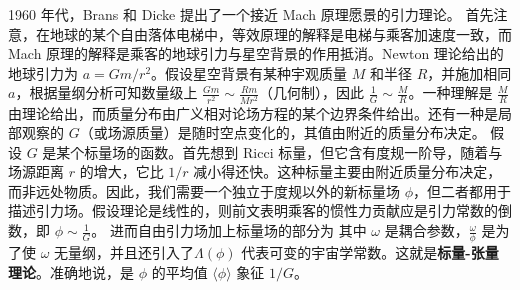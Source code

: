1960 年代，Brans 和 Dicke\cite{Brans-Dicke} 提出了一个接近 Mach 原理愿景的引力理论。
首先注意，在地球的某个自由落体电梯中，等效原理的解释是电梯与乘客加速度一致，而 Mach 原理的解释是乘客的地球引力与星空背景的作用抵消。Newton 理论给出的地球引力为 $a=Gm/r^2$。假设星空背景有某种宇观质量 $M$ 和半径 $R$，并施加相同 $a$，根据量纲分析可知数量级上 $\frac{Gm}{r^2}\sim \frac{Rm}{Mr^2}$（几何制），因此 $\frac{1}{G}\sim\frac{M}{R}$。一种理解是 $\frac{M}{R}$ 由理论给出，而质量分布由广义相对论场方程的某个边界条件给出。还有一种是局部观察的 $G$（或场源质量）是随时空点变化的，其值由附近的质量分布决定。
假设 $G$ 是某个标量场的函数。首先想到 Ricci 标量，但它含有度规一阶导，随着与场源距离 $r$ 的增大，它比 $1/r$ 减小得还快。这种标量主要由附近质量分布决定，而非远处物质。因此，我们需要一个独立于度规以外的新标量场 $\phi$，但二者都用于描述引力场。假设理论是线性的，则前文表明乘客的惯性力贡献应是引力常数的倒数，即 $\phi\sim\frac{1}{G}$。
进而自由引力场加上标量场的部分为
其中 $\omega$ 是耦合参数，$\frac{\omega}{\phi}$ 是为了使 $\omega$ 无量纲，并且还引入了$\Lambda(\phi)$ 代表可变的宇宙学常数。这就是\textbf{标量-张量理论}。准确地说，是
$\phi$ 的平均值 $\langle\phi\rangle$ 象征 $1/G$。

